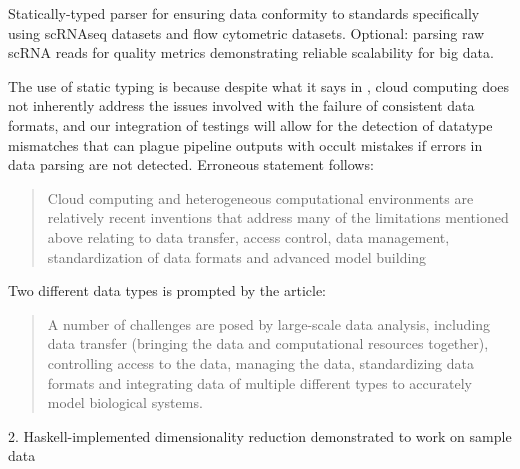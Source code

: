 \documentclass[11pt,letterpaper]{article}
\begin{document}



Statically-typed parser for ensuring data conformity to standards specifically using scRNAseq datasets and flow cytometric datasets. Optional: parsing raw scRNA reads for quality metrics demonstrating reliable scalability for big data.

The use of static typing is because despite what it says in \cite{Schadt_2010}, cloud computing does not inherently address the issues involved with the failure of consistent data formats, and our integration of testings will allow for the detection of datatype mismatches that can plague pipeline outputs with occult mistakes if errors in data parsing are not detected. Erroneous statement follows:

\begin{quotation}
  Cloud computing and heterogeneous computational environments are relatively recent inventions that address many of the limitations mentioned above relating to data transfer, access control, data management, standardization of data formats and advanced model building
\end{quotation}

Two different data types is prompted by the \cite{Schadt_2010} article:

\begin{quotation}
A number of challenges are posed by large-scale data analysis, including data transfer (bringing the data and computational resources together), controlling access to the data, managing the data, standardizing data formats and integrating data of multiple different types to accurately model biological systems.  
\end{quotation}

2. Haskell-implemented dimensionality reduction demonstrated to work on sample data
\end{document}

